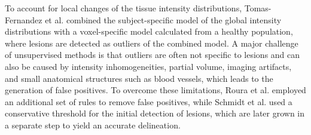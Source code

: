 To account for local changes of the tissue intensity distributions,
Tomas-Fernandez et al. \cite{tomas2015} combined the subject-specific model of
the global intensity distributions with a voxel-specific model calculated from a
healthy population, where lesions are detected as outliers of the combined
model. A major challenge of unsupervised methods is that outliers are often not
specific to lesions and can also be caused by intensity inhomogeneities, partial
volume, imaging artifacts, and small anatomical structures such as blood
vessels, which leads to the generation of false positives. To overcome these
limitations, Roura et al. \cite{roura2015} employed an additional set of rules
to remove false positives, while Schmidt et al. \cite{schmidt2012automated} used
a conservative threshold for the initial detection of lesions, which are later
grown in a separate step to yield an accurate delineation.





